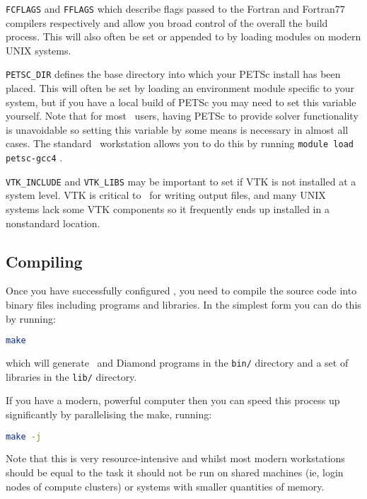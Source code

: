 \lstinline[language=Bash]+FCFLAGS+ and \lstinline[language=Bash]+FFLAGS+ which
describe flags passed to the Fortran and Fortran77 compilers respectively and
allow you broad control of the overall the build process. This will also often
be set or appended to by loading modules on modern UNIX systems.

\lstinline[language=Bash]+PETSC_DIR+ defines the base directory into which your
PETSc install has been placed. This will often be set by loading an environment
module specific to your system, but if you have a local build of PETSc you may
need to set this variable yourself. Note that for most \fluidity\ users, having
PETSc to provide solver functionality is unavoidable so setting this variable
by some means is necessary in almost all cases. The standard \fluidity\
workstation allows you to do this by running
\lstinline[language=Bash]+module load petsc-gcc4+ .

\lstinline[language=Bash]+VTK_INCLUDE+ and \lstinline[language=Bash]+VTK_LIBS+
may be important to set if VTK is not installed at a system level. VTK is
critical to \fluidity\ for writing output files, and many UNIX systems lack some
VTK components so it frequently ends up installed in a nonstandard location.

\subsection{Compiling \fluidity}
\label{sec:compiling_fluidity}

Once you have successfully configured \fluidity, you need to compile the source
code into binary files including programs and libraries. In the simplest form
you can do this by running:

\begin{lstlisting}[language=Bash]
make
\end{lstlisting}

which will generate \fluidity\ and Diamond programs in the
\lstinline[language=Bash]+bin/+ directory and a set of libraries in the
\lstinline[language=Bash]+lib/+ directory. 

If you have a modern, powerful computer then you can speed this process up
significantly by parallelising the make, running:

\begin{lstlisting}[language=Bash]
make -j
\end{lstlisting}

Note that this is very resource-intensive and whilst most modern workstations
should be equal to the task it should not be run on shared machines (ie, login
nodes of compute clusters) or systems with smaller quantities of memory.

